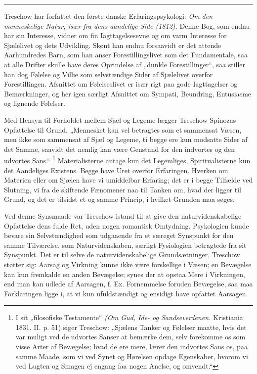 \documentclass[12pt,a4paper,openany]{book}
\newcommand{\opage}[1]{\marginnote{\footnotesize\textit{[#1]}}}
\begin{document}
\begin{center}\rule{2cm}{0.4pt}\end{center}

Treschow har forfattet den første danske Erfaringspsykologi: \textit{Om den
menneskelige Natur, især fra dens aandelige Side (1812).} Denne Bog, som endnu
har sin Interesse, vidner om fin Iagttagelsesevne og om varm Interesse for
Sjælelivet og dets Udvikling. Skønt han endnu forsaavidt er det attende
Aarhundredes Barn, som han anser Forestillingslivet som det Fundamentale, saa
at alle Drifter skulle have deres Oprindelse af „dunkle Forestillinger“, saa
stiller han dog Følelse og Villie som selvstændige Sider af Sjælelivet overfor
Forestillingen. Afsnittet om Følelseslivet er især rigt paa gode Iagttagelser
og Bemærkninger, og her igen særligt Afsnittet om Sympati, Beundring,
Entusiasme og lignende Følelser.

Med Hensyn til Forholdet mellem Sjæl og Legeme lægger Treschow Spinozas
Opfattelse til Grund. „Mennesket kan vel betragtes som et sammensat Væsen, men
ikke som sammensat af Sjæl og Legeme, ti begge ere kun modsatte Sider af det
Samme, saavidt det nemlig kan være Genstand for den indvortes og den udvortes Sans.“%
\footnote[1]{I sit „filosofiske Testamente“ \textit{(Om Gud, Ide- og
Sandseverdenen.} Kristiania 1831. II. p. 51) siger Treschow: „Sjælens Tanker og
Følelser maatte, hvis det var muligt ved de udvortes Sanser at bemærke dem,
selv forekomme os som visse Arter af Bevægelse; hvad de ere mere, lærer den
indvortes Sans os, paa samme Maade, som vi ved Synet og Hørelsen opdage
Egenskaber, hvorom vi ved Lugten og Smagen ej engang faa nogen Anelse, og
omvendt.“} Materialisterne antage kun det Legemliges, Spiritualisterne kun det
Aandeliges Existens. Begge have Uret overfor Erfaringen. Hverken om Materien
eller om Sjælen have vi umiddelbar Erfaring; det er i begge Tilfælde ved
Slutning, vi fra de skiftende Fænomener naa til Tanken om, hvad der ligger til
Grund, og det er tilsidst et og samme Princip, i hvilket Grunden maa søges.

Ved denne Synsmaade var Treschow istand til at give den
\setcounter{footnote}{0}%
\opage{91}naturvidenskabelige Opfattelse dens fulde Ret, uden nogen romantisk
Omtydning. Psykologien kunde bevare sin Selvstændighed som udgaaende fra et
særeget Synspunkt for den samme Tilværelse, som Naturvidenskaben, særligt
Fysiologien betragtede fra sit Synspunkt. Det er til selve de
naturvidenskabelige Grundsætninger, Treschow støtter sig: Aarsag og Virkning
kunne ikke være forskellige i Væsen; en Bevægelse kan kun fremkalde en anden
Bevægelse; synes der at opstaa Mere i Virkningen, end man kan udlede af
Aarsagen, f. Ex. Fornemmelse foruden Bevægelse, saa maa Forklaringen ligge i,
at vi kun ufuldstændigt og ensidigt have opfattet Aarsagen.
\end{document}
